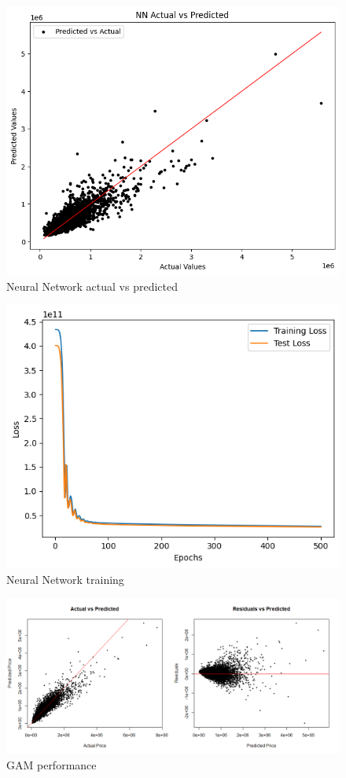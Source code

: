 \documentclass[a4paper, 11pt]{article}
\begin{document}
\begin{figure}[H]
\includegraphics[scale=0.7]{NNpred}
\centering
\caption{Neural Network actual vs predicted}
\label{fig:NNpred}
\end{figure}

\begin{figure}[H]
\includegraphics[scale=0.75]{traintestloss}
\centering
\caption{Neural Network training}
\label{fig:traintestloss}
\end{figure}

\begin{figure}[H]
\includegraphics[scale=0.4]{gamperf}
\centering
\caption{GAM performance}
\label{fig:gamperf}
\end{figure}
\end{document}
